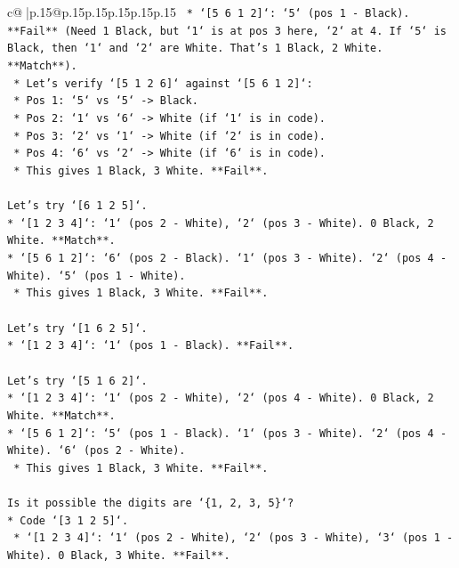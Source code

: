 \documentclass{article}
\begin{document}
{\begin{supertabular}{c@{$\;$}|p{.15\linewidth}@{}p{.15\linewidth}p{.15\linewidth}p{.15\linewidth}p{.15\linewidth}p{.15\linewidth}}
{{{\texttt{        *   `{[}5 6 1 2{]}`: `5` (pos 1 {-} Black). **Fail** (Need 1 Black, but `1` is at pos 3 here, `2` at 4. If `5` is Black, then `1` and `2` are White. That's 1 Black, 2 White. **Match**).} \\
\texttt{        *   Let's verify `{[}5 1 2 6{]}` against `{[}5 6 1 2{]}`:} \\
\texttt{            *   Pos 1: `5` vs `5` {-}> Black.} \\
\texttt{            *   Pos 2: `1` vs `6` {-}> White (if `1` is in code).} \\
\texttt{            *   Pos 3: `2` vs `1` {-}> White (if `2` is in code).} \\
\texttt{            *   Pos 4: `6` vs `2` {-}> White (if `6` is in code).} \\
\texttt{            *   This gives 1 Black, 3 White. **Fail**.} \\
\\ 
\texttt{Let's try `{[}6 1 2 5{]}`.} \\
\texttt{*   `{[}1 2 3 4{]}`: `1` (pos 2 {-} White), `2` (pos 3 {-} White). 0 Black, 2 White. **Match**.} \\
\texttt{*   `{[}5 6 1 2{]}`: `6` (pos 2 {-} Black). `1` (pos 3 {-} White). `2` (pos 4 {-} White). `5` (pos 1 {-} White).} \\
\texttt{    *   This gives 1 Black, 3 White. **Fail**.} \\
\\ 
\texttt{Let's try `{[}1 6 2 5{]}`.} \\
\texttt{*   `{[}1 2 3 4{]}`: `1` (pos 1 {-} Black). **Fail**.} \\
\\ 
\texttt{Let's try `{[}5 1 6 2{]}`.} \\
\texttt{*   `{[}1 2 3 4{]}`: `1` (pos 2 {-} White), `2` (pos 4 {-} White). 0 Black, 2 White. **Match**.} \\
\texttt{*   `{[}5 6 1 2{]}`: `5` (pos 1 {-} Black). `1` (pos 3 {-} White). `2` (pos 4 {-} White). `6` (pos 2 {-} White).} \\
\texttt{    *   This gives 1 Black, 3 White. **Fail**.} \\
\\ 
\texttt{Is it possible the digits are `\{1, 2, 3, 5\}`?} \\
\texttt{*   Code `{[}3 1 2 5{]}`.} \\
\texttt{    *   `{[}1 2 3 4{]}`: `1` (pos 2 {-} White), `2` (pos 3 {-} White), `3` (pos 1 {-} White). 0 Black, 3 White. **Fail**.} \\
}}}
\end{supertabular}}
\end{document}
